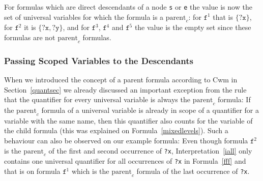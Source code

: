 For formulas which are direct descendants of a node \texttt{s} or \texttt{e} the value is now the set of universal variables for which the formula is a $\text{parent}_c$:
for $\texttt{f}^1$ that is $\{\texttt{?x}\}$, for $\texttt{f}^2$ it is $\{\texttt{?x}, \texttt{?y}\}$, and for $\texttt{f}^3$, $\texttt{f}^4$ and $\texttt{f}^5$ 
the value is the empty set since these formulas are not 
$\text{parent}_c$ formulas. 



\subsubsection{Passing Scoped Variables to the Descendants}
When we introduced the concept of a parent formula according to Cwm in Section~\ref{quantsec} we already discussed an important exception from the rule that the quantifier 
for every universal variable is always the $\text{parent}_c$ formula: If the $\text{parent}_c$ formula of a universal variable is already in scope of a quantifier for a 
variable with the same name, then this quantifier also counts for the variable of the child formula (this was explained on Formula~\ref{mixedlevels}). 
Such a behaviour can also be observed on our example formula: Even though
formula $\texttt{f}^2$ is the $\text{parent}_c$ of the first and second occurrence of \texttt{?x}, %
Interpretation~\ref{iall} 
 only contains one universal quantifier for all occurrences of \texttt{?x} in Formula~\ref{fff} and that is on formula $\texttt{f}^1$ which is the $\text{parent}_c$ formula 
 of the last occurrence of \texttt{?x}.
%  
 
